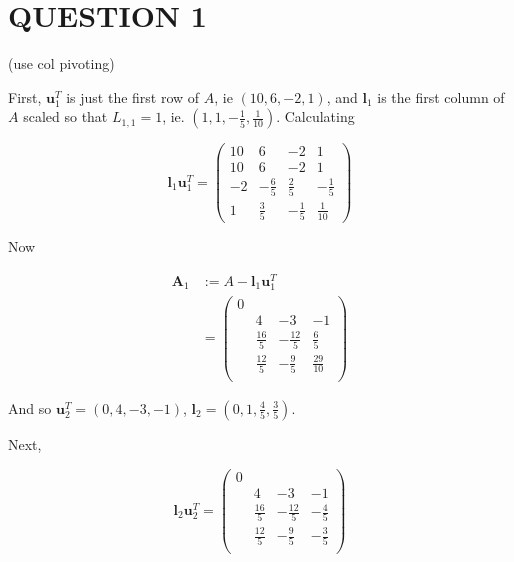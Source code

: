 \documentclass[a4paper]{article}
\begin{document}
	
\maketitle

\section{QUESTION 1}

(use col pivoting)

First, $ \mathbf{u}_{1}^{T} $ is just the first row of $ A $, ie $ (10,6,-2,1) $, and $ \mathbf{l}_{1} $ is the first column of $ A $ scaled so that $ L_{1,1} = 1 $, ie. $ (1,1,-\frac{1}{5},\frac{1}{10}) $. Calculating

\[ \mathbf{l}_{1} \mathbf{u}_{1}^{T} = \begin{pmatrix}
10 & 6 & -2 & 1 \\
10 & 6 & -2 & 1 \\
-2 & -\frac{6}{5} & \frac{2}{5} & - \frac{1}{5} \\
1 & \frac{3}{5} & - \frac{1}{5} & \frac{1}{10}  
\end{pmatrix} \]

Now

\begin{align*}
\mathbf{A}_{1} & := A - \mathbf{l}_{1} \mathbf{u}_{1}^{T} \\
& = \left(
\begin{array}{cccc}
0 & & & \\
& 4 & -3 & -1 \\
& \frac{16}{5} & -\frac{12}{5} &
\frac{6}{5} \\
& \frac{12}{5} & -\frac{9}{5} &
\frac{29}{10} \\
\end{array}
\right)
\end{align*}


And so $ \mathbf{u}_{2}^{T} = (0,4,-3,-1  ) $, $ \mathbf{l}_{2} = (0,1,\frac{4}{5},\frac{3}{5}) $.

Next,

\[ \mathbf{l}_{2} \mathbf{u}_{2}^{T} = \left(
\begin{array}{cccc}
0 & & & \\
 & 4 & -3 & -1 \\
& \frac{16}{5} & -\frac{12}{5} &
-\frac{4}{5} \\
& \frac{12}{5} & -\frac{9}{5} &
-\frac{3}{5} \\
\end{array}
\right) \]
\end{document}
